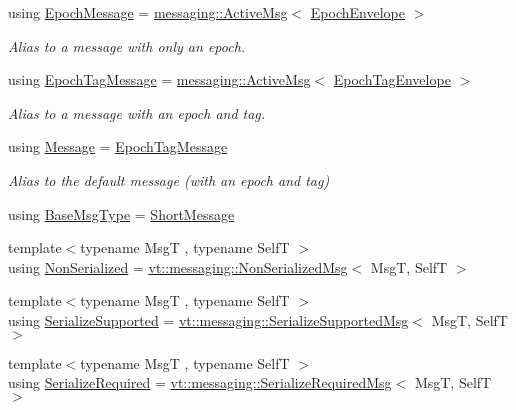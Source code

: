 \begin{DoxyCompactItemize}
using \hyperlink{namespacevt_ad67368ffae52d7325002586b41bb150e}{Epoch\+Message} = \hyperlink{structvt_1_1messaging_1_1_active_msg}{messaging\+::\+Active\+Msg}$<$ \hyperlink{namespacevt_af71a025689a3da5037785b53a7a8e78c}{Epoch\+Envelope} $>$
\begin{DoxyCompactList}\small\item\em Alias to a message with only an epoch. \end{DoxyCompactList}\item 
using \hyperlink{namespacevt_a4ccc13b06bff8a4a35426a1a082a95a9}{Epoch\+Tag\+Message} = \hyperlink{structvt_1_1messaging_1_1_active_msg}{messaging\+::\+Active\+Msg}$<$ \hyperlink{namespacevt_af23b58014ced6898422213a0e5e6a27a}{Epoch\+Tag\+Envelope} $>$
\begin{DoxyCompactList}\small\item\em Alias to a message with an epoch and tag. \end{DoxyCompactList}\item 
using \hyperlink{namespacevt_a3a3ddfef40b4c90915fa43cdd5f129ea}{Message} = \hyperlink{namespacevt_a4ccc13b06bff8a4a35426a1a082a95a9}{Epoch\+Tag\+Message}
\begin{DoxyCompactList}\small\item\em Alias to the default message (with an epoch and tag) \end{DoxyCompactList}\item 
using \hyperlink{namespacevt_a44d0d4e144748f2b19a1cfd962f50338}{Base\+Msg\+Type} = \hyperlink{namespacevt_a1125ac1da6c0bbf141e0ea0739d7602d}{Short\+Message}
\item 
{\footnotesize template$<$typename MsgT , typename SelfT $>$ }\\using \hyperlink{namespacevt_a378e4a02213923b4ba1c3f9d2a1424c7}{Non\+Serialized} = \hyperlink{structvt_1_1messaging_1_1_non_serialized_msg}{vt\+::messaging\+::\+Non\+Serialized\+Msg}$<$ MsgT, SelfT $>$
\item 
{\footnotesize template$<$typename MsgT , typename SelfT $>$ }\\using \hyperlink{namespacevt_a3862b8e3f67ab03f3a4313d828592fa9}{Serialize\+Supported} = \hyperlink{structvt_1_1messaging_1_1_serialize_supported_msg}{vt\+::messaging\+::\+Serialize\+Supported\+Msg}$<$ MsgT, SelfT $>$
\item 
{\footnotesize template$<$typename MsgT , typename SelfT $>$ }\\using \hyperlink{namespacevt_a9e60e2e8929828639383ac1d6643384d}{Serialize\+Required} = \hyperlink{structvt_1_1messaging_1_1_serialize_required_msg}{vt\+::messaging\+::\+Serialize\+Required\+Msg}$<$ MsgT, SelfT $>$

\end{DoxyCompactItemize}
